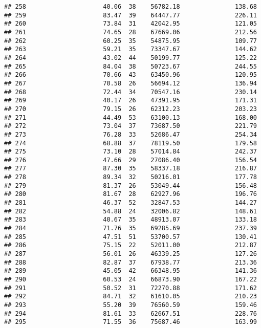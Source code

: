 \documentclass[
]{article}
\begin{document}
\begin{verbatim}
## 258                     40.06  38    56782.18               138.68
## 259                     83.47  39    64447.77               226.11
## 260                     73.84  31    42042.95               121.05
## 261                     74.65  28    67669.06               212.56
## 262                     60.25  35    54875.95               109.77
## 263                     59.21  35    73347.67               144.62
## 264                     43.02  44    50199.77               125.22
## 265                     84.04  38    50723.67               244.55
## 266                     70.66  43    63450.96               120.95
## 267                     70.58  26    56694.12               136.94
## 268                     72.44  34    70547.16               230.14
## 269                     40.17  26    47391.95               171.31
## 270                     79.15  26    62312.23               203.23
## 271                     44.49  53    63100.13               168.00
## 272                     73.04  37    73687.50               221.79
## 273                     76.28  33    52686.47               254.34
## 274                     68.88  37    78119.50               179.58
## 275                     73.10  28    57014.84               242.37
## 276                     47.66  29    27086.40               156.54
## 277                     87.30  35    58337.18               216.87
## 278                     89.34  32    50216.01               177.78
## 279                     81.37  26    53049.44               156.48
## 280                     81.67  28    62927.96               196.76
## 281                     46.37  52    32847.53               144.27
## 282                     54.88  24    32006.82               148.61
## 283                     40.67  35    48913.07               133.18
## 284                     71.76  35    69285.69               237.39
## 285                     47.51  51    53700.57               130.41
## 286                     75.15  22    52011.00               212.87
## 287                     56.01  26    46339.25               127.26
## 288                     82.87  37    67938.77               213.36
## 289                     45.05  42    66348.95               141.36
## 290                     60.53  24    66873.90               167.22
## 291                     50.52  31    72270.88               171.62
## 292                     84.71  32    61610.05               210.23
## 293                     55.20  39    76560.59               159.46
## 294                     81.61  33    62667.51               228.76
## 295                     71.55  36    75687.46               163.99

\end{verbatim}
\end{document}
